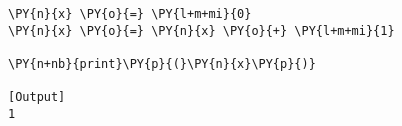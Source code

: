 \begin{Verbatim}[label=\makebox{\href{https://github.com/unipi-physics-labs/lab1-notes/tree/main/snippy/assignment.py}{https://github.com/.../assignment.py}},commandchars=\\\{\}]
\PY{n}{x} \PY{o}{=} \PY{l+m+mi}{0}
\PY{n}{x} \PY{o}{=} \PY{n}{x} \PY{o}{+} \PY{l+m+mi}{1}

\PY{n+nb}{print}\PY{p}{(}\PY{n}{x}\PY{p}{)}

[Output]
1
\end{Verbatim}
